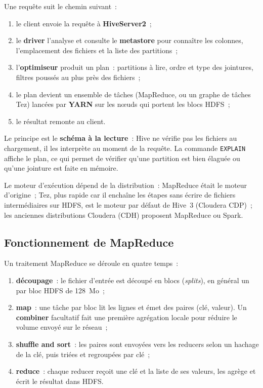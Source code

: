 \noindent Une requête suit le chemin suivant~:
\begin{enumerate}
	\item le client envoie la requête à \textbf{HiveServer2}~;
	\item le \textbf{driver} l'analyse et consulte le \textbf{metastore} pour connaître les colonnes, l'emplacement des fichiers et la liste des partitions~;
	\item l'\textbf{optimiseur} produit un plan~: partitions à lire, ordre et type des jointures, filtres poussés au plus près des fichiers~;
	\item le plan devient un ensemble de tâches (MapReduce, ou un graphe de tâches Tez) lancées par \textbf{YARN} sur les n\oe uds qui portent les blocs HDFS~;
	\item le résultat remonte au client.
\end{enumerate}

\noindent Le principe est le \textbf{schéma à la lecture}~: Hive ne vérifie pas les fichiers au chargement, il les interprète au moment de la requête. La commande \texttt{EXPLAIN} affiche le plan, ce qui permet de vérifier qu'une partition est bien élaguée ou qu'une jointure est faite en mémoire.

\vspace{0.2cm}

\noindent Le moteur d'exécution dépend de la distribution~: MapReduce était le moteur d'origine~; Tez, plus rapide car il enchaîne les étapes sans écrire de fichiers intermédiaires sur HDFS, est le moteur par défaut de Hive~3 (Cloudera CDP)~; les anciennes distributions Cloudera (CDH) proposent MapReduce ou Spark.

\subsection{Fonctionnement de MapReduce}

\noindent Un traitement MapReduce se déroule en quatre temps~:
\begin{enumerate}
	\item \textbf{découpage}~: le fichier d'entrée est découpé en blocs (\textit{splits}), en général un par bloc HDFS de 128~Mo~;
	\item \textbf{map}~: une tâche par bloc lit les lignes et émet des paires (clé, valeur). Un \textbf{combiner} facultatif fait une première agrégation locale pour réduire le volume envoyé sur le réseau~;
	\item \textbf{shuffle and sort}~: les paires sont envoyées vers les reducers selon un hachage de la clé, puis triées et regroupées par clé~;
	\item \textbf{reduce}~: chaque reducer reçoit une clé et la liste de ses valeurs, les agrège et écrit le résultat dans HDFS.
\end{enumerate}

